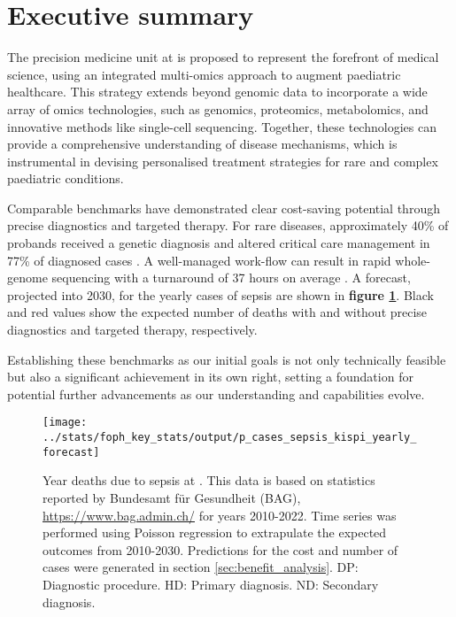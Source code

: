 \section{Executive summary}

The precision medicine unit at \kispi is proposed to represent the forefront of medical science, using an integrated multi-omics approach to augment paediatric healthcare. 
This strategy extends beyond genomic data to incorporate a wide array of omics technologies, such as genomics, proteomics, metabolomics, and innovative methods like single-cell sequencing. 
Together, these technologies  can provide a comprehensive understanding of disease mechanisms, which is instrumental in devising personalised treatment strategies for rare and complex paediatric conditions.

Comparable benchmarks have demonstrated clear cost-saving potential through precise diagnostics and targeted therapy.
For rare diseases, approximately 40\% of probands received a genetic diagnosis 
\citep{wright2023genomic, wojcik2024genome}
and altered critical care management in 77\% of diagnosed cases \citep{lunke2023integrated}.
A well-managed work-flow can result in rapid whole-genome sequencing with a turnaround of 37 hours on average
 \citep{abou2023rapid}.
A forecast, projected into 2030, for the yearly cases of sepsis are shown in 
\textbf{figure
\ref{fig:p_cases_sepsis_kispi_yearly_forecast_exec}}.
Black and red values show the expected number of deaths with and without  precise diagnostics and targeted therapy, respectively. 


Establishing these benchmarks as our initial goals is not only technically feasible but also a significant achievement in its own right, setting a foundation for potential further advancements as our understanding and capabilities evolve.

\begin{figure}[h] \hspace*{0cm} 
\begin{center}
	\texttt{[image: ../stats/foph\_key\_stats/output/p\_cases\_sepsis\_kispi\_yearly\_forecast]}
	\caption{Year deaths due to sepsis at \kispi.
	This data is based on statistics reported by Bundesamt für Gesundheit (BAG), 
	\url{https://www.bag.admin.ch/} for years 2010-2022. 
	Time series was performed using Poisson regression to extrapulate the expected outcomes from 2010-2030.
	Predictions for the cost and number of cases were generated in section 
	\ref{sec:benefit_analysis}.	
	DP: Diagnostic procedure.
HD: Primary diagnosis.
ND: Secondary diagnosis.
}
	\label{fig:p_cases_sepsis_kispi_yearly_forecast_exec}
\end{center}
\end{figure}























